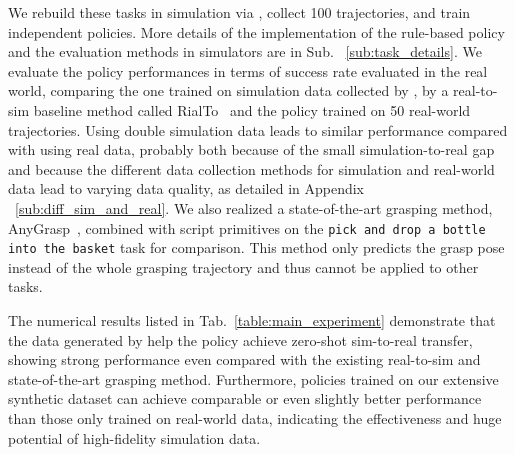 We rebuild these tasks in simulation via \our, collect 100 trajectories, and train independent policies.
More details of the implementation of the rule-based policy and the evaluation methods in simulators are in Sub. ~\ref{sub:task_details}. 
We evaluate the policy performances in terms of success rate evaluated in the real world, comparing the one trained on simulation data collected by \our, by a real-to-sim baseline method called RialTo~\citep{ritotorne2024rialto} and the policy trained on 50 real-world trajectories. Using double simulation data leads to similar performance compared with using real data, probably both because of the small simulation-to-real gap and because the different data collection methods for simulation and real-world data lead to varying data quality, as detailed in Appendix ~\ref{sub:diff_sim_and_real}.
We also realized a state-of-the-art grasping method, AnyGrasp~\citep{fang2023anygrasp}, combined with script primitives on the \texttt{pick and drop a bottle into the basket} task for comparison. This method only predicts the grasp pose instead of the whole grasping trajectory and thus cannot be applied to other tasks. 

The numerical results listed in Tab.~\ref{table:main_experiment} demonstrate that the data generated by \our help the policy achieve zero-shot sim-to-real transfer, showing strong performance even compared with the existing real-to-sim and state-of-the-art grasping method.
Furthermore, policies trained on our extensive synthetic dataset can achieve comparable or even slightly better performance than those only trained on real-world data, indicating the effectiveness and huge potential of high-fidelity simulation data. 

